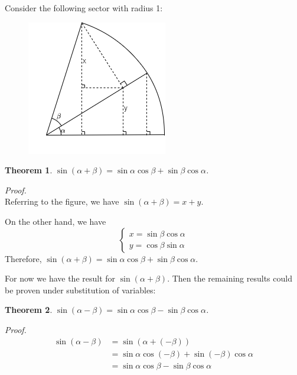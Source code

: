 \documentclass[12pt]{article}
\newtheorem*{theorem}{Theorem}
\renewenvironment{proof}[1][Proof]{\begin{snugshade*} \textit{{#1}.}\\}{\hfill \qedsymbol \end{snugshade*}}
\begin{document}
    Consider the following sector with radius 1:
    \begin{figure}[H]
        \centering
        \includegraphics[scale=0.8]{ab.png}
    \end{figure}

    \begin{theorem}
        $\sin(\alpha+\beta)=\sin{\alpha}\cos{\beta}+\sin{\beta}\cos{\alpha}$.
    \end{theorem}

    \begin{proof}
        Referring to the figure, we have $\sin(\alpha+\beta)=x+y$.
        
        On the other hand, we have $$\begin{cases}
            x=\sin{\beta}\cos{\alpha}\\y=\cos{\beta}\sin{\alpha}
        \end{cases}$$ Therefore, $\sin(\alpha+\beta)=\sin{\alpha}\cos{\beta}+\sin{\beta}\cos{\alpha}$.
    \end{proof}

    For now we have the result for $\sin(\alpha+\beta)$. Then the remaining results could be proven under substitution of variables:
    
    \begin{theorem}
        $\sin(\alpha-\beta)=\sin{\alpha}\cos{\beta}-\sin{\beta}\cos{\alpha}$.
    \end{theorem}

    \begin{proof}
        \begin{align*}
            \sin(\alpha-\beta)&=\sin(\alpha+(-\beta))\\&=\sin{\alpha}\cos(-\beta)+\sin(-\beta)\cos{\alpha}\\&=\sin{\alpha}\cos{\beta}-\sin{\beta}\cos{\alpha}
        \end{align*}
    \end{proof}
\end{document}
